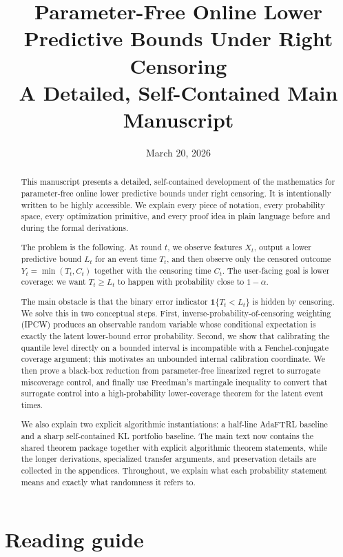 \documentclass[11pt]{article}
\title{Parameter-Free Online Lower Predictive Bounds Under Right Censoring\\A Detailed, Self-Contained Main Manuscript}
\author{}
\date{March 20, 2026}
\newcommand{\1}{\mathbf{1}}
\begin{document}
\maketitle

\begin{abstract}
This manuscript presents a detailed, self-contained development of the mathematics for parameter-free online lower predictive bounds under right censoring. It is intentionally written to be highly accessible. We explain every piece of notation, every probability space, every optimization primitive, and every proof idea in plain language before and during the formal derivations.

The problem is the following. At round $t$, we observe features $X_t$, output a lower predictive bound $L_t$ for an event time $T_t$, and then observe only the censored outcome $Y_t=\min(T_t,C_t)$ together with the censoring time $C_t$. The user-facing goal is lower coverage: we want $T_t\ge L_t$ to happen with probability close to $1-\alpha$.

The main obstacle is that the binary error indicator $\1\{T_t< L_t\}$ is hidden by censoring. We solve this in two conceptual steps. First, inverse-probability-of-censoring weighting (IPCW) produces an observable random variable whose conditional expectation is exactly the latent lower-bound error probability. Second, we show that calibrating the quantile level directly on a bounded interval is incompatible with a Fenchel-conjugate coverage argument; this motivates an unbounded internal calibration coordinate. We then prove a black-box reduction from parameter-free linearized regret to surrogate miscoverage control, and finally use Freedman's martingale inequality to convert that surrogate control into a high-probability lower-coverage theorem for the latent event times.

We also explain two explicit algorithmic instantiations: a half-line AdaFTRL baseline and a sharp self-contained KL portfolio baseline. The main text now contains the shared theorem package together with explicit algorithmic theorem statements, while the longer derivations, specialized transfer arguments, and preservation details are collected in the appendices. Throughout, we explain what each probability statement means and exactly what randomness it refers to.
\end{abstract}

\tableofcontents

\section{Reading guide}
\end{document}

